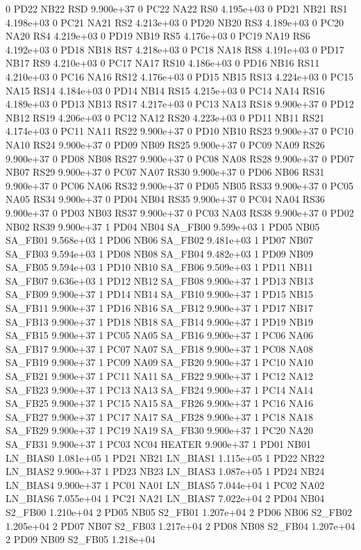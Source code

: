 0 PD22 NB22 RSD 9.900e+37 
0 PC22 NA22 RS0 4.195e+03 
0 PD21 NB21 RS1 4.198e+03 
0 PC21 NA21 RS2 4.213e+03 
0 PD20 NB20 RS3 4.189e+03 
0 PC20 NA20 RS4 4.219e+03 
0 PD19 NB19 RS5 4.176e+03 
0 PC19 NA19 RS6 4.192e+03 
0 PD18 NB18 RS7 4.218e+03 
0 PC18 NA18 RS8 4.191e+03 
0 PD17 NB17 RS9 4.210e+03 
0 PC17 NA17 RS10 4.186e+03 
0 PD16 NB16 RS11 4.210e+03 
0 PC16 NA16 RS12 4.176e+03 
0 PD15 NB15 RS13 4.224e+03 
0 PC15 NA15 RS14 4.184e+03 
0 PD14 NB14 RS15 4.215e+03 
0 PC14 NA14 RS16 4.189e+03 
0 PD13 NB13 RS17 4.217e+03 
0 PC13 NA13 RS18 9.900e+37 
0 PD12 NB12 RS19 4.206e+03 
0 PC12 NA12 RS20 4.223e+03 
0 PD11 NB11 RS21 4.174e+03 
0 PC11 NA11 RS22 9.900e+37 
0 PD10 NB10 RS23 9.900e+37 
0 PC10 NA10 RS24 9.900e+37 
0 PD09 NB09 RS25 9.900e+37 
0 PC09 NA09 RS26 9.900e+37 
0 PD08 NB08 RS27 9.900e+37 
0 PC08 NA08 RS28 9.900e+37 
0 PD07 NB07 RS29 9.900e+37 
0 PC07 NA07 RS30 9.900e+37 
0 PD06 NB06 RS31 9.900e+37 
0 PC06 NA06 RS32 9.900e+37 
0 PD05 NB05 RS33 9.900e+37 
0 PC05 NA05 RS34 9.900e+37 
0 PD04 NB04 RS35 9.900e+37 
0 PC04 NA04 RS36 9.900e+37 
0 PD03 NB03 RS37 9.900e+37 
0 PC03 NA03 RS38 9.900e+37 
0 PD02 NB02 RS39 9.900e+37 
1 PD04 NB04 SA_FB00 9.599e+03 
1 PD05 NB05 SA_FB01 9.568e+03 
1 PD06 NB06 SA_FB02 9.481e+03 
1 PD07 NB07 SA_FB03 9.594e+03 
1 PD08 NB08 SA_FB04 9.482e+03 
1 PD09 NB09 SA_FB05 9.594e+03 
1 PD10 NB10 SA_FB06 9.509e+03 
1 PD11 NB11 SA_FB07 9.636e+03 
1 PD12 NB12 SA_FB08 9.900e+37 
1 PD13 NB13 SA_FB09 9.900e+37 
1 PD14 NB14 SA_FB10 9.900e+37 
1 PD15 NB15 SA_FB11 9.900e+37 
1 PD16 NB16 SA_FB12 9.900e+37 
1 PD17 NB17 SA_FB13 9.900e+37 
1 PD18 NB18 SA_FB14 9.900e+37 
1 PD19 NB19 SA_FB15 9.900e+37 
1 PC05 NA05 SA_FB16 9.900e+37 
1 PC06 NA06 SA_FB17 9.900e+37 
1 PC07 NA07 SA_FB18 9.900e+37 
1 PC08 NA08 SA_FB19 9.900e+37 
1 PC09 NA09 SA_FB20 9.900e+37 
1 PC10 NA10 SA_FB21 9.900e+37 
1 PC11 NA11 SA_FB22 9.900e+37 
1 PC12 NA12 SA_FB23 9.900e+37 
1 PC13 NA13 SA_FB24 9.900e+37 
1 PC14 NA14 SA_FB25 9.900e+37 
1 PC15 NA15 SA_FB26 9.900e+37 
1 PC16 NA16 SA_FB27 9.900e+37 
1 PC17 NA17 SA_FB28 9.900e+37 
1 PC18 NA18 SA_FB29 9.900e+37 
1 PC19 NA19 SA_FB30 9.900e+37 
1 PC20 NA20 SA_FB31 9.900e+37 
1 PC03 NC04 HEATER 9.900e+37 
1 PD01 NB01 LN_BIAS0 1.081e+05 
1 PD21 NB21 LN_BIAS1 1.115e+05 
1 PD22 NB22 LN_BIAS2 9.900e+37 
1 PD23 NB23 LN_BIAS3 1.087e+05 
1 PD24 NB24 LN_BIAS4 9.900e+37 
1 PC01 NA01 LN_BIAS5 7.044e+04 
1 PC02 NA02 LN_BIAS6 7.055e+04 
1 PC21 NA21 LN_BIAS7 7.022e+04 
2 PD04 NB04 S2_FB00 1.210e+04 
2 PD05 NB05 S2_FB01 1.207e+04 
2 PD06 NB06 S2_FB02 1.205e+04 
2 PD07 NB07 S2_FB03 1.217e+04 
2 PD08 NB08 S2_FB04 1.207e+04 
2 PD09 NB09 S2_FB05 1.218e+04 
